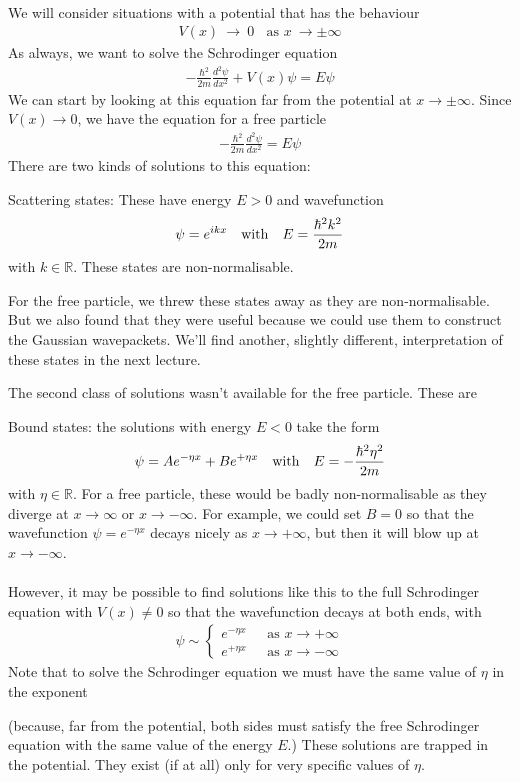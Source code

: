 \documentclass[12pt]{article}
\def\be{\begin{eqnarray}}
\def\ee{\end{eqnarray}}
\newcommand{\nn}{\nonumber}
\newcommand\para{\paragraph{}}
\newcommand{\ra}{\rightarrow}
\newcommand{\co}{\color{olive}}
\newcommand{\R}{{\mathds R}}
\begin{document}
\para
{\co We will consider situations with a potential that has the behaviour
%
\be V(x)\ \rightarrow\ 0\ \ \ \ \mbox{as $x\ \rightarrow \pm \infty$}\nn\ee
%
As always, we want to solve the Schrodinger equation
%
\be -\frac{\hbar^2}{2m}\frac{d^2\psi}{dx^2} + V(x)\psi = E\psi\nn\ee
%
We can start by looking at this equation far from the potential at $x\ra \pm \infty$. Since $V(x) \ra 0$, we have the equation for a free particle
%
\be -\frac{\hbar^2}{2m}\frac{d^2\psi}{dx^2}  = E\psi\nn\ee
%
There are two kinds of solutions to this equation:}
%
\begin{itemize}
{\co
\item Scattering states: These have energy  $E>0$ and wavefunction
%
\be \psi = e^{ikx}\ \ \ {\rm with}\ \ \ E=\frac{\hbar^2k^2}{2m}\nn\ee
%
with $k\in \R$. These states are non-normalisable.}

For the free particle, we threw these states away as they are non-normalisable. But we also found that they were useful because we could use them to construct the Gaussian wavepackets. We'll find another, slightly different, interpretation of these states in the next lecture. 


\item The second class of solutions wasn't available for the free particle. These are

{\co Bound states: the solutions with energy $E<0$ take the form
%
\be \psi  = Ae^{-\eta x} + B e^{+\eta x}\ \ \ {\rm with}\ \ \ E=-\frac{\hbar^2\eta^2}{2m}\nn\ee
%
with $\eta\in \R$. For a free particle, these would be badly non-normalisable as they diverge at $x\ra \infty$ or $x\ra -\infty$.  For example, we could set $B=0$ so that the wavefunction $\psi=e^{-\eta x}$ decays nicely as $x\rightarrow +\infty$, but then it will blow up at $x\rightarrow -\infty$. 



\para
However, it may be possible to find solutions like this to the full Schrodinger equation with $V(x) \neq 0$ so that the wavefunction decays at both ends, with
%
\be \psi \sim \left\{\begin{array}{lc} e^{-\eta x}\ \ \ & \mbox{as $x\rightarrow +\infty$}\\ e^{+\eta x}\ \ \ & \mbox{as $x\rightarrow -\infty$}\end{array}\right. \nn\ee
%
Note that to solve the Schrodinger equation we must have the same value of $\eta$ in the exponent} (because, far from the potential, both sides must satisfy the free Schrodinger equation with the same value of the energy $E$.) {\co These solutions are trapped in the potential. They exist (if at all) only for very specific values of $\eta$.} 
\end{itemize}
\end{document}
